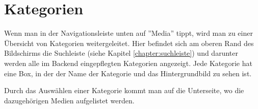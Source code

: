 \section{Kategorien}

Wenn man in der Navigationsleiste unten auf ''Media'' tippt, wird man zu einer Übersicht von Kategorien weitergeleitet.
Hier befindet sich am oberen Rand des Bildschirms die Suchleiste (siehe Kapitel \ref{chapter:suchleiste}) und darunter
werden alle im Backend eingepflegten Kategorien angezeigt. Jede Kategorie hat eine Box, in der der Name der Kategorie
und das Hintergrundbild zu sehen ist.

Durch das Auswählen einer Kategorie kommt man auf die Unterseite, wo die dazugehörigen Medien aufgelistet werden. 

\begin{figure}[H]
    \begin{minipage}{0.5\textwidth}
        \centering

\end{minipage}
\end{figure}
